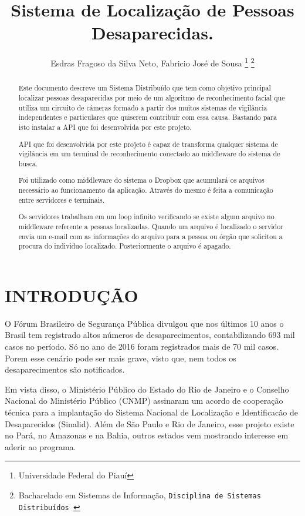 \documentclass[letterpaper, 10 pt, conference]{ieeeconf}  %
\title{\LARGE \bf
Sistema de Localiza\c{c}\~ao de Pessoas Desaparecidas. 
}
\author{Esdras Fragoso da Silva Neto, Fabricio Jos\'e de Sousa
\thanks{Universidade Federal do Piau\'i}%
\thanks{ Bacharelado em Sistemas de Informa\c{c}\~ao,
  {\tt\small Disciplina de Sistemas Distribu\'idos }}%
}
\begin{document}
\maketitle
\thispagestyle{empty}
\pagestyle{empty}


\begin{abstract}

Este documento descreve um Sistema Distribu\'ido que tem como objetivo principal localizar pessoas desaparecidas por meio de um algoritmo de reconhecimento facial que utiliza um  circuito de c\^ameras formado a partir dos muitos sistemas de vigil\^ancia  independentes e particulares que quiserem contribuir com essa causa. Bastando para isto instalar a API que foi desenvolvida por este projeto.  

API que foi desenvolvida por este projeto \'e capaz de transforma qualquer sistema de vigil\^ancia em um terminal de reconhecimento conectado ao middleware do sistema de busca. 

Foi utilizado como middleware do sistema o Dropbox que acumular\'a os arquivos necess\'ario ao funcionamento da aplica\c{c}\~ao. Atrav\'es do mesmo \'e feita a comunicação entre servidores e terminais. 

Os servidores trabalham em um loop infinito verificando se existe algum arquivo no middleware referente a pessoas localizadas. Quando um arquivo \'e localizado o servidor envia um e-mail com as informa\c{c}\~oes do arquivo para a pessoa ou \'org\~ao que solicitou a procura do individuo localizado. Posteriormente o arquivo \'e apagado.


\end{abstract}


\section{INTRODU\c{C}\~AO}

O F\'orum Brasileiro de Segurança P\'ublica divulgou que nos \'ultimos 10 anos o Brasil tem registrado altos n\'umeros de desaparecimentos, contabilizando 693 mil casos no per\'iodo.  S\'o no ano de 2016 foram registrados mais de 70 mil casos. Porem esse cen\'ario pode ser mais grave, visto que, nem todos os desaparecimentos s\~ao notificados. 

Em vista disso, o Minist\'erio P\'ublico do Estado do Rio de Janeiro e o Conselho Nacional do Minist\'erio P\'ublico (CNMP) assinaram um acordo de coopera\c{c}\~ao t\'ecnica para a implanta\c{c}\~ao do Sistema Nacional de Localiza\c{c}\~ao e Identifica{c}\~ao de Desaparecidos (Sinalid).  Al\'em de S\~ao Paulo e Rio de Janeiro, esse projeto existe no Par\'a, no Amazonas e na Bahia, outros estados vem mostrando interesse em aderir ao programa.
\end{document}
